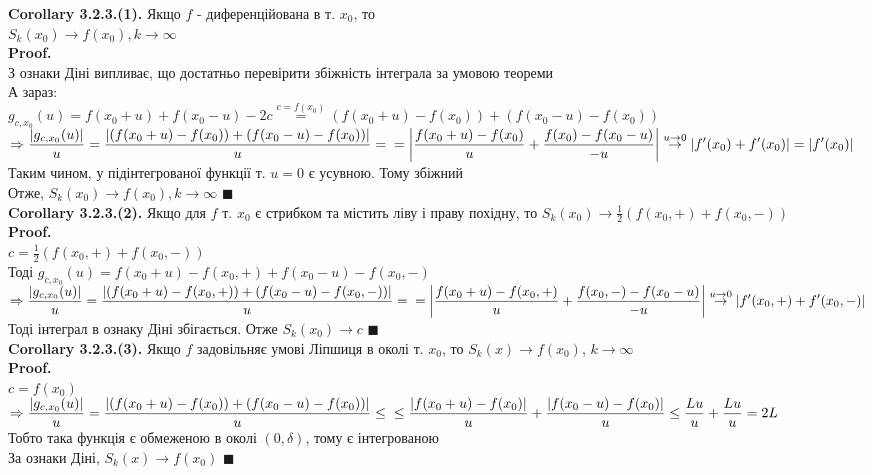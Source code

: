 \documentclass[a4paper, 14pt]{extarticle}
\def\hugespace{\vspace{5mm} \\}
\begin{document}
\textbf{Corollary 3.2.3.(1).} Якщо $f$ - диференційована в т. $x_0$, то \\ $S_k(x_0) \to f(x_0), k \to \infty$\\
\textbf{Proof.}\\
З ознаки Діні випливає, що достатньо перевірити збіжність інтеграла за умовою теореми\\
А зараз:\\
$g_{c,x_0}(u) = f(x_0+u)+f(x_0-u) - 2c \overset{c = f(x_0)}{=} (f(x_0+u)-f(x_0))+(f(x_0-u)-f(x_0))$\\
$\displaystyle \Rightarrow \frac{\abs{g_{c,x_0}(u)}}{u} = \frac{\abs{(f(x_0+u)-f(x_0))+(f(x_0-u)-f(x_0))}}{u} = \\ = \abs{ \frac{f(x_0+u)-f(x_0)}{u} + \frac{f(x_0)-f(x_0-u)}{-u} } \overset{u \to 0}{\to} |f'(x_0)+f'(x_0)| = |f'(x_0)|$\\
Таким чином, у підінтегрованої функції т. $u=0$ є усувною. Тому збіжний\\
Отже, $S_k(x_0) \to f(x_0), k \to \infty$ $\blacksquare$
\hugespace
\textbf{Corollary 3.2.3.(2).} Якщо для $f$ т. $x_0$ є стрибком та містить ліву і праву похідну, то $\displaystyle S_k(x_0) \to \frac{1}{2} (f(x_0,+)+f(x_0,-))$\\
\textbf{Proof.}\\
$\displaystyle c = \frac{1}{2} (f(x_0,+)+f(x_0,-))$\\
Тоді $g_{c,x_0}(u) = f(x_0+u) - f(x_0,+) + f(x_0-u) - f(x_0,-)$\\
$\displaystyle \Rightarrow \frac{\abs{g_{c,x_0}(u)}}{u} = \frac{\abs{(f(x_0+u)-f(x_0,+))+(f(x_0-u)-f(x_0,-))}}{u} = \\ = \abs{ \frac{f(x_0+u)-f(x_0,+)}{u} + \frac{f(x_0,-)-f(x_0-u)}{-u} } \overset{u \to 0}{\to} |f'(x_0,+)+f'(x_0,-)|$\\
Тоді інтеграл в ознаку Діні збігається. Отже $S_k(x_0) \to c$ $\blacksquare$
\hugespace
\textbf{Corollary 3.2.3.(3).} Якщо $f$ задовільняє умові Ліпшиця в околі т. $x_0$, то $S_k(x) \to f(x_0)$, $k \to \infty$\\
\textbf{Proof.}\\
$c = f(x_0)$\\
$\displaystyle \Rightarrow \frac{\abs{g_{c,x_0}(u)}}{u} = \frac{\abs{(f(x_0+u)-f(x_0))+(f(x_0-u)-f(x_0))}}{u} \leq \\ \leq \frac{\abs{f(x_0+u)-f(x_0)}}{u} + \frac{\abs{f(x_0-u)-f(x_0)}}{u} \leq \frac{Lu}{u} + \frac{Lu}{u} = 2L$\\
Тобто така функція є обмеженою в околі $(0, \delta)$, тому є інтегрованою\\
За ознаки Діні, $S_k(x) \to f(x_0)$ $\blacksquare$
\hugespace
\end{document}
